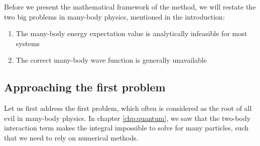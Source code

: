 Before we present the mathematical framework of the method, we will restate the two big problems in many-body physics, mentioned in the introduction:
\begin{enumerate}
	\item The many-body energy expectation value is analytically infeasible for most systems
	\item The correct many-body wave function is generally unavailable
\end{enumerate}

\subsection{Approaching the first problem}
Let us first address the first problem, which often is considered as the root of all evil in many-body physics. In chapter \ref{chp:quantum}, we saw that the two-body interaction term makes the integral impossible to solve for many particles, such that we need to rely on numerical methods. 

